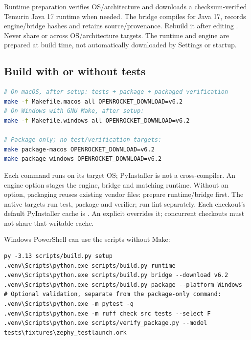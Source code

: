 Runtime preparation verifies OS/architecture and downloads a checksum-verified
Temurin Java 17 runtime when needed. The bridge compiles for Java 17, records
engine/bridge hashes and retains source/provenance. Rebuild it after editing
. Never share  or
 across OS/architecture targets. The runtime and engine are
prepared at build time, not automatically downloaded by Settings or startup.

\subsection{Build with or without tests}
\begin{lstlisting}[language=bash]
# On macOS, after setup: tests + package + packaged verification
make -f Makefile.macos all OPENROCKET_DOWNLOAD=v6.2
# On Windows with GNU Make, after setup:
make -f Makefile.windows all OPENROCKET_DOWNLOAD=v6.2

# Package only; no test/verification targets:
make package-macos OPENROCKET_DOWNLOAD=v6.2
make package-windows OPENROCKET_DOWNLOAD=v6.2
\end{lstlisting}
Each command runs on its target OS; PyInstaller is not a cross-compiler.
An engine option stages the engine, bridge and matching runtime. Without an
option, packaging reuses existing vendor files: prepare runtime/bridge first.
The native  targets run test, package and verifier; run lint separately.
Each checkout's default PyInstaller cache is .
An explicit  overrides it; concurrent checkouts
must not share that writable cache.

Windows PowerShell can use the scripts without Make:
\begin{lstlisting}
py -3.13 scripts/build.py setup
.venv\Scripts\python.exe scripts/build.py runtime
.venv\Scripts\python.exe scripts/build.py bridge --download v6.2
.venv\Scripts\python.exe scripts/build.py package --platform Windows
# Optional validation, separate from the package-only command:
.venv\Scripts\python.exe -m pytest -q
.venv\Scripts\python.exe -m ruff check src tests --select F
.venv\Scripts\python.exe scripts/verify_package.py --model tests\fixtures\zephy_testlaunch.ork
\end{lstlisting}

